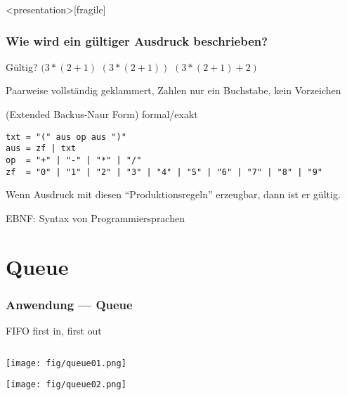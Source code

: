 \begin{frame}<presentation>[fragile]
\frametitle{Wie wird ein gültiger Ausdruck beschrieben?}

Gültig?
\hfill
$(3 * (2 + 1 )$
\hfill
$(3 * (2 + 1) )$
\hfill
$(3 * (2 + 1 ) + 2)$

\vfill
{} Paarweise vollständig geklammert, Zahlen nur ein Buchstabe, kein Vorzeichen

\pause\vfill
{} (Extended Backus-Naur Form) formal/exakt

\begin{Verbatim}
txt = "(" aus op aus ")"
aus = zf | txt
op  = "+" | "-" | "*" | "/"
zf  = "0" | "1" | "2" | "3" | "4" | "5" | "6" | "7" | "8" | "9"
\end{Verbatim}
Wenn Ausdruck mit diesen "`Produktionsregeln"' erzeugbar, dann ist er gültig.

EBNF: Syntax von Programmiersprachen
\end{frame}

\section{Queue}



\begin{multicols}{2}
\begin{frame}[fragile]
\frametitle<presentation>{Anwendung --- Queue}

FIFO first in, first out

\begin{columns}[c]\begin{column}{0.5 \textwidth}
\texttt{[image: fig/queue01.png]}\par
\texttt{[image: fig/queue02.png]}
\end{column}\begin{column}{0.5 \textwidth}
\end{column}\end{columns}

\end{frame}


\end{multicols}



